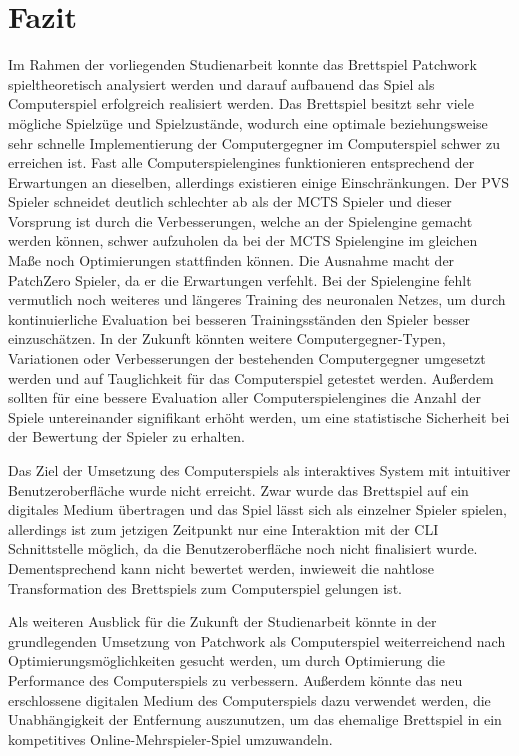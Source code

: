 \chapter{Fazit}
\label{chapter:fazit}

Im Rahmen der vorliegenden Studienarbeit konnte das Brettspiel Patchwork spieltheoretisch analysiert werden und darauf aufbauend das Spiel als Computerspiel erfolgreich realisiert werden. Das Brettspiel besitzt sehr viele mögliche Spielzüge und Spielzustände, wodurch eine optimale beziehungsweise sehr schnelle Implementierung der Computergegner im Computerspiel schwer zu erreichen ist. Fast alle Computerspielengines funktionieren entsprechend der Erwartungen an dieselben, allerdings existieren einige Einschränkungen. Der \ac{PVS} Spieler schneidet deutlich schlechter ab als der \ac{MCTS} Spieler und dieser Vorsprung ist durch die Verbesserungen, welche an der Spielengine gemacht werden können, schwer aufzuholen da bei der \ac{MCTS} Spielengine im gleichen Maße noch Optimierungen stattfinden können. Die Ausnahme macht der PatchZero Spieler, da er die Erwartungen verfehlt. Bei der Spielengine fehlt vermutlich noch weiteres und längeres Training des neuronalen Netzes, um durch kontinuierliche Evaluation bei besseren Trainingsständen den Spieler besser einzuschätzen. In der Zukunft könnten weitere Computergegner-Typen, Variationen oder Verbesserungen der bestehenden Computergegner umgesetzt werden und auf Tauglichkeit für das Computerspiel getestet werden. Außerdem sollten für eine bessere Evaluation aller Computerspielengines die Anzahl der Spiele untereinander signifikant erhöht werden, um eine statistische Sicherheit bei der Bewertung der Spieler zu erhalten.

Das Ziel der Umsetzung des Computerspiels als interaktives System mit intuitiver Benutzeroberfläche wurde nicht erreicht. Zwar wurde das Brettspiel auf ein digitales Medium übertragen und das Spiel lässt sich als einzelner Spieler spielen, allerdings ist zum jetzigen Zeitpunkt nur eine Interaktion mit der \ac{CLI} Schnittstelle möglich, da die Benutzeroberfläche noch nicht finalisiert wurde. Dementsprechend kann nicht bewertet werden, inwieweit die nahtlose Transformation des Brettspiels zum Computerspiel gelungen ist.

Als weiteren Ausblick für die Zukunft der Studienarbeit könnte in der grundlegenden Umsetzung von Patchwork als Computerspiel weiterreichend nach Optimierungsmöglichkeiten gesucht werden, um durch Optimierung die Performance des Computerspiels zu verbessern. Außerdem könnte das neu erschlossene digitalen Medium des Computerspiels dazu verwendet werden, die Unabhängigkeit der Entfernung auszunutzen, um das ehemalige Brettspiel in ein kompetitives Online-Mehrspieler-Spiel umzuwandeln.